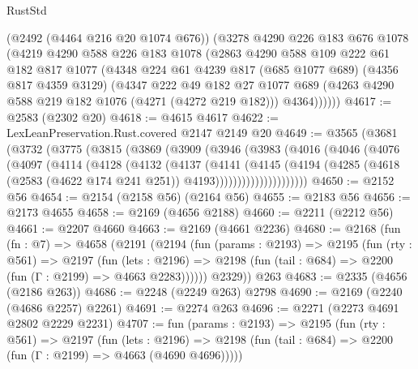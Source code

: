 \begin{lexlean}{RustStd}
\begin{coremodule}
{\begin{coremodule}
{{{{{{{{{{{{{{{      (@2492 (@4464 @216 @20 @1074 @676))
      (@3278
        @4290
        @226
        @183
        @676
        @1078
        (@4219
          @4290
          @588
          @226
          @183
          @1078
          (@2863
            @4290
            @588
            @109
            @222
            @61
            @182
            @817
            @1077
            (@4348
              @224
              @61
              @4239
              @817
              (@685 @1077 @689)
              (@4356 @817 @4359 @3129)
              (@4347
                @222
                @49
                @182
                @27
                @1077
                @689
                (@4263 @4290 @588 @219 @182 @1076 (@4271 (@4272 @219 @182)))
                @4364))))))
@4617 := @2583 (@2302 @20)
@4618 := @4615 @4617
@4622 := LexLeanPreservation.Rust.covered @2147 @2149 @20
@4649 := @3565
    (@3681
      (@3732
        (@3775
          (@3815
            (@3869
              (@3909
                (@3946
                  (@3983
                    (@4016
                      (@4046
                        (@4076
                          (@4097
                            (@4114
                              (@4128
                                (@4132
                                  (@4137
                                    (@4141
                                      (@4145
                                        (@4194
                                          (@4285
                                            (@4618
                                              (@2583 (@4622 @174 @241 @251))
                                              @4193)))))))))))))))))))))
@4650 := @2152 @56
@4654 := @2154 (@2158 @56) (@2164 @56)
@4655 := @2183 @56
@4656 := @2173 @4655
@4658 := @2169 (@4656 @2188)
@4660 := @2211 (@2212 @56)
@4661 := @2207 @4660
@4663 := @2169 (@4661 @2236)
@4680 := @2168
    (fun (fn : @7) =>
    @4658
      (@2191
        (@2194
          (fun (params : @2193) =>
          @2195
            (fun (rty : @561) =>
            @2197
              (fun (lets : @2196) =>
              @2198 (fun (tail : @684) => @2200 (fun (Γ : @2199) => @4663 @2283))))))
        @2329))
    @263
@4683 := @2335 (@4656 (@2186 @263))
@4686 := @2248 (@2249 @263) @2798
@4690 := @2169 (@2240 (@4686 @2257) @2261)
@4691 := @2274 @263
@4696 := @2271 (@2273 @4691 @2802 @2229 @2231)
@4707 := fun (params : @2193) =>
  @2195
    (fun (rty : @561) =>
    @2197
      (fun (lets : @2196) =>
      @2198 (fun (tail : @684) => @2200 (fun (Γ : @2199) => @4663 (@4690 @4696)))))
}}}}}}}}}}}}}}}
\end{coremodule}}
\end{coremodule}
\end{lexlean}
